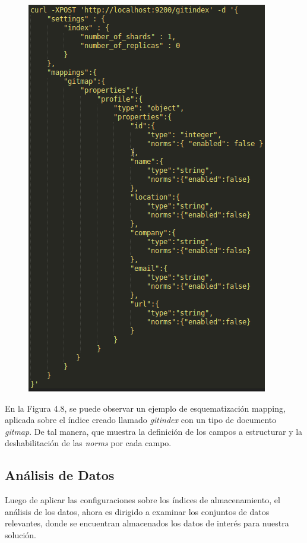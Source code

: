 \begin{figure}[H]
	\centering
	\includegraphics[height=0.4\textheight]{fig01/mappgit}
	\label{fig:RHP02}
\end{figure}
En la Figura 4.8, se puede observar un ejemplo de esquematización mapping, aplicada sobre el índice creado llamado \textit{gitindex} con un tipo de documento \textit{gitmap}. De tal manera, que muestra la definición de los campos a estructurar y la deshabilitación de las \textit{norms} por cada campo.



\subsection{Análisis de Datos}
\label{subsec:subsec04}

Luego de aplicar las configuraciones sobre los índices de almacenamiento, el análisis de los datos, ahora es dirigido a examinar los conjuntos de datos relevantes, donde se encuentran almacenados los datos de interés para nuestra solución.

